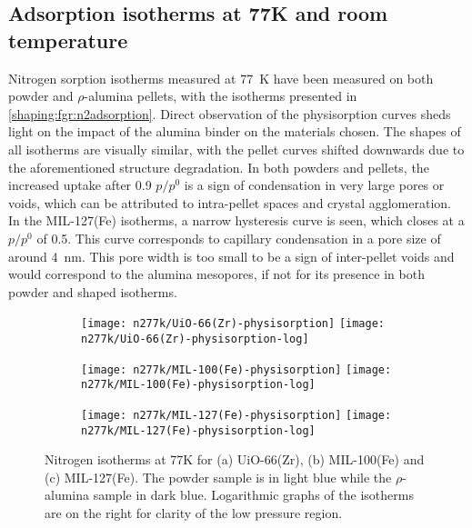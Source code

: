 
\subsection{Adsorption isotherms at 77K and room temperature}

Nitrogen sorption isotherms measured at \SI{77}{\kelvin} have been
measured on both powder and \( \rho \)-alumina pellets, with the isotherms
presented in \autoref{shaping:fgr:n2adsorption}.
Direct observation of the physisorption curves sheds light on the
impact of the alumina binder on the materials chosen.
The shapes of all isotherms are visually similar, with the pellet curves
shifted downwards due to the aforementioned structure degradation.
In both powders and pellets, the increased uptake after 0.9 \(p/p^0\)
is a sign of condensation in very large pores or voids, which can
be attributed to intra-pellet spaces and crystal agglomeration.
In the MIL-127(Fe) isotherms, a narrow hysteresis curve is seen,
which closes at a \(p/p^0\) of 0.5. This curve corresponds to
capillary condensation in a pore size of around \SI{4}{\nano\metre}.
This pore width is too small to be a sign of
inter-pellet voids and would correspond to the alumina mesopores, 
if not for its presence in both powder and shaped isotherms.

\begin{figure}[p!]
	\centering

	\begin{subfigure}{\linewidth}
		\centering
		\parbox[c]{0.1\linewidth}{\caption{}\label{shaping:fgr:n277kuio66}}%
		\texttt{[image: n277k/UiO-66(Zr)-physisorption]}%
		\texttt{[image: n277k/UiO-66(Zr)-physisorption-log]}%
	\end{subfigure}

	\begin{subfigure}{\linewidth}
		\centering
		\parbox[c]{0.1\linewidth}{\caption{}\label{shaping:fgr:n277kmil100}}%
		\texttt{[image: n277k/MIL-100(Fe)-physisorption]}%
		\texttt{[image: n277k/MIL-100(Fe)-physisorption-log]}%
	\end{subfigure}

	\begin{subfigure}{\linewidth}
		\centering
		\parbox[c]{0.1\linewidth}{\caption{}\label{shaping:fgr:n277kmil127}}%
		\texttt{[image: n277k/MIL-127(Fe)-physisorption]}%
		\texttt{[image: n277k/MIL-127(Fe)-physisorption-log]}%
	\end{subfigure}

	\caption{Nitrogen isotherms at 77K for (a) UiO-66(Zr),
		(b) MIL-100(Fe) and (c) MIL-127(Fe). The powder sample is in light
		blue while the \(\rho\)-alumina sample in dark blue. Logarithmic
		graphs of the isotherms are on the right for clarity of the low
		pressure region.}%
	\label{shaping:fgr:n2adsorption}
\end{figure}

